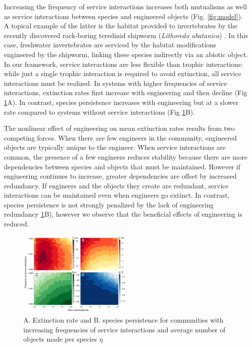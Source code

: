 \documentclass[9pt,twocolumn,twoside]{pnas-new}
\begin{document}
Increasing the frequency of service interactions increases both mutualisms as well as service interactions between species and engineered objects (Fig. \ref{fig:model}).
A topical example of the latter is the habitat provided to invertebrates by the recently discovered rock-boring teredinid shipworm (\emph{Lithoredo abatanica}) \cite{Shipway2019}. %
In this case, freshwater invertebrates are serviced by the habitat modifications engineered by the shipworm, linking these species indirectly via an abiotic object.
In our framework, service interactions are less flexible than trophic interactions: while just a single trophic interaction is required to avoid extinction, all service interactions must be realized.
In systems with higher frequencies of service interactions, extinction rates first increase with engineering and then decline (Fig \ref{fig:engineers}A).
In contrast, species persistence increases with engineering but at a slower rate compared to systems without service interactions (Fig \ref{fig:engineers}B).


The nonlinear effect of engineering on mean extinction rates results from two competing forces.
When there are few engineers in the community, engineered objects are typically unique to the engineer.
When service interactions are common, the presence of a few engineers reduces stability because there are more dependencies between species and objects that must be maintained.
However if engineering continues to increase, greater dependencies are offset by increased redundancy.
If engineers and the objects they create are redundant, service interactions can be maintained even when engineers go extinct.
In contrast, species persistence is not strongly penalized by the lack of engineering redundancy \ref{fig:engineers}B), however we observe that the beneficial effects of engineering is reduced.




\begin{figure}
\centering
\includegraphics[width=0.5\textwidth]{fig_engineers3.pdf}
\caption{
A. Extinction rate and 
B. species persistence for communities with increasing frequencies of service interactions and average number of objects made per species $\eta$
}
\label{fig:engineers}
\end{figure}
\end{document}
